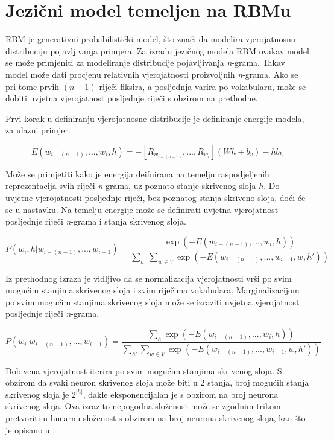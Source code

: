\documentclass[times, utf8, diplomski, numeric]{fer}
\begin{document}
\section{Jezični model temeljen na RBMu}

RBM je generativni probabilistički model, što znači da modelira vjerojatnosnu distribuciju pojavljivanja primjera. Za izradu jezičnog modela RBM ovakav model se može primjeniti za modeliranje distribucije pojavljivanja \textit{n}-grama. Takav model može dati procjenu relativnih vjerojatnosti proizvoljnih \textit{n}-grama. Ako se pri tome prvih $(n - 1)$ riječi fiksira, a posljednja varira po vokabularu, može se dobiti uvjetna vjerojatnost posljednje riječi s obzirom na prethodne.

Prvi korak u definiranju vjerojatnosne distribucije je definiranje energije modela, za ulazni primjer.

\[
E(w_{i - (n - 1)}, ... , w_i, h) =  - \left[R_{w_{i - (n - 1)}}, ... , R_{w_i} \right] (W h + b_v) - h b_h
\]

Može se primjetiti kako je energija deifnirana na temelju raspodjeljenih reprezentacija svih riječi \textit{n}-grama, uz poznato stanje skrivenog sloja $h$. Do uvjetne vjerojatnosti posljednje riječi, bez poznatog stanja skriveno sloja, doći će se u nastavku. Na temelju energije može se definirati uvjetna vjerojatnost posljednje riječi \textit{n}-grama i stanja skrivenog sloja.

\[
P(w_i, h | w_{i - (n - 1)}, ... , w_{i - 1})
 = \frac{\exp(-E(w_{i - (n - 1)}, ... , w_i, h))}
  {\sum_{h'} \sum_{w \in V} \exp(-E(w_{i - (n - 1)}, ... , w_{i - 1}, w, h'))}
\]

Iz prethodnog izraza je vidljivo da se normalizacija vjerojatnosti vrši po svim mogućim stanjima skrivenog sloja i svim riječima vokabulara. Marginalizacijom po svim mogućim stanjima skrivenog sloja može se izraziti uvjetna vjerojatnost posljednje riječi \textit{n}-grama.

\[
P(w_i | w_{i - (n - 1)}, ... , w_{i - 1})
 = \frac{\sum_h \exp(-E(w_{i - (n - 1)}, ... , w_i, h))}
  {\sum_{h'} \sum_{w \in V} \exp(-E(w_{i - (n - 1)}, ... , w_{i - 1}, w, h'))}
\]

Dobivena vjerojatnost iterira po svim mogućim stanjima skrivenog sloja. S obzirom da svaki neuron skrivenog sloja može biti u $2$ stanja, broj mogućih stanja skrivenog sloja je $2^{|h|}$, dakle eksponencijalan je s obzirom na broj neurona skrivenog sloja. Ova izrazito nepogodna složenost može se zgodnim trikom pretvoriti u linearnu složenost s obzirom na broj neurona skrivenog sloja, kao što je opisano u \cite{hinton_2002_cd}.
\end{document}
